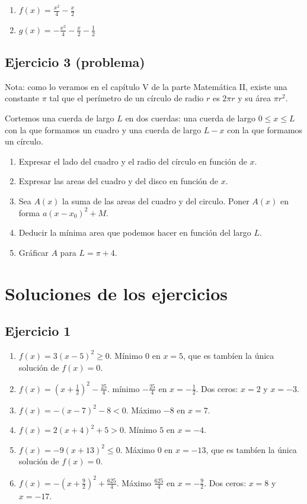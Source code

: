 \begin{enumerate}
\item $f(x) = \frac{x^2}{4} - \frac{x}{2}$
\item $g(x) = -\frac{x^2}{4} - \frac{x}{2} - \frac{1}{2}$
\end{enumerate}

\subsection*{Ejercicio 3 (problema)}

Nota: como lo veramos en el capítulo V de la parte Matemática II, existe
una constante $\pi$ tal que el perímetro de un círculo de radio $r$ es
$2 \pi r$ y su área $\pi r^2$.

Cortemos una cuerda de largo $L$ en dos cuerdas:
una cuerda de largo $0 \leq x \leq L$ con la que formamos un cuadro y
una cuerda de largo $L-x$ con la que formamos un círculo.

\begin{enumerate}
\item Expresar el lado del cuadro y el radio del círculo en función de $x$.
\item Expresar las areas del cuadro y del disco en función de $x$.
\item Sea $A(x)$ la suma de las areas del cuadro y del circulo.
  Poner $A(x)$ en forma $a \left( x - x_0 \right)^2 + M$.
\item Deducir la mínima area que podemos hacer en función del largo $L$.
\item Gráficar $A$ para $L = \pi + 4$.
\end{enumerate}

\section{Soluciones de los ejercicios}

\subsection*{Ejercicio 1}

\begin{enumerate}
\item $f(x) = 3{(x-5)}^2 \geq 0$. Mínimo 0 en $x = 5$, que es tambíen
  la única solución de $f(x) = 0$.
\item $f(x) = \left(x + \frac{1}{2}\right)^2 - \frac{25}{4}$. mínimo
  $-\frac{25}{4}$ en $x = -\frac{1}{2}$. Dos ceros:
  $x = 2$ y $x=-3$.
\item $f(x) = -{(x-7)}^2 - 8 < 0$. Máximo $-8$ en $x = 7$.
\item $f(x) = 2{(x+4)}^2 + 5 > 0$. Mínimo $5$ en $x = -4$.
\item $f(x) = -9{(x+13)}^2 \leq 0$. Máximo 0 en $x = -13$, que es tambíen
  la única solución de $f(x) = 0$.
\item $f(x) = -\left( x + \frac{9}{2} \right)^2 + \frac{625}{4}$.
  Máximo $\frac{625}{4}$ en $ x = -\frac{9}{2}$. Dos ceros:
  $x = 8$ y $x = -17$.
\end{enumerate}

